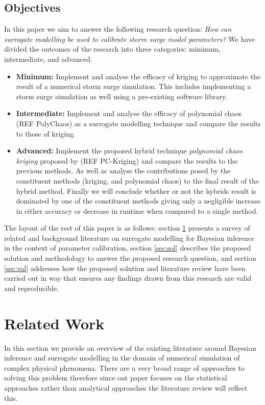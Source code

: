 \documentclass[12pt,a4paper]{article}
\begin{document}
\subsection{Objectives}
\noindent
In this paper we aim to answer the following research question: \textit{How can surrogate modelling be used to calibrate storm surge model parameters?} We have divided the outcomes of the research into three categories: minimum, intermediate, and advanced.
\begin{itemize}
	\item
	\textbf{Minimum: } Implement and analyse the efficacy of kriging to approximate the result of a numerical storm surge simulation. This includes implementing a storm surge simulation as well using a pre-existing software library.
	\item
	\textbf{Intermediate:} Implement and analyse the efficacy of polynomial chaos (REF PolyChaos) as a surrogate modelling technique and compare the results to those of kriging.
	\item
	\textbf{Advanced:} Implement the proposed hybrid technique \textit{polynomial chaos kriging} proposed by (REF PC-Kriging) and compare the results to the previous methods. As well as analyse the contributions posed by the constituent methods (kriging, and polynomial chaos) to the final result of the hybrid method. Finally we will conclude whether or not the hybrids result is dominated by one of the constituent methods giving only a negligible increase in either accuracy or decrease in runtime when compared to a single method.
\end{itemize}

The layout of the rest of this paper is as follows: section \ref{sec:lit} presents a survey of related and background literature on surrogate modelling for Bayesian inference in the context of parameter calibration, section \ref{sec:sol} describes the proposed solution and methodology to answer the proposed research question, and section \ref{sec:val} addresses how the proposed solution and literature review have been carried out in  way that ensures any findings drawn from this research are valid and reproducible.

\section{Related Work} \label{sec:lit}
\noindent
In this section we provide an overview of the existing literature around Bayesian inference and surrogate modelling in the domain of numerical simulation of complex physical phenomena. There are a very broad range of approaches to solving this problem therefore since out paper focuses on the statistical approaches rather than analytical approaches the literature review will reflect this.
\end{document}
